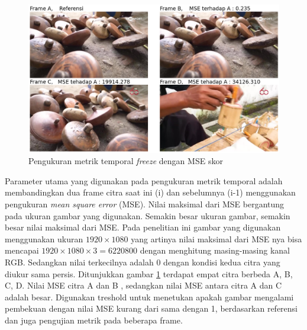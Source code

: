 \begin{figure}[H]
	\vspace{-0.1cm}
	\begin{center}
		\includegraphics[width=1\columnwidth]{bab4/Gambar/temporal-score.png}
	\end{center}
	\vspace{-0.2cm}
	\caption{Pengukuran metrik temporal \textit{freeze} dengan MSE skor}
	\label{temporal-score}
\end{figure}

Parameter utama yang digunakan pada pengukuran metrik temporal adalah membandingkan dua frame citra saat ini (i) dan sebelumnya (i-1) menggunakan pengukuran \textit{mean square error} (MSE). Nilai maksimal dari MSE bergantung pada ukuran gambar yang digunakan. Semakin besar ukuran gambar, semakin besar nilai maksimal dari MSE. Pada penelitian ini gambar yang digunakan menggunakan ukuran $1920\times1080$ yang artinya nilai maksimal dari MSE nya bisa mencapai $1920\times1080\times3=6220800$ dengan menghitung masing-masing kanal RGB. Sedangkan nilai terkecilnya adalah 0 dengan kondisi kedua citra yang diukur sama persis.  Ditunjukkan  gambar \ref{temporal-score} terdapat empat citra berbeda {A, B, C, D}. Nilai MSE citra A dan B , sedangkan nilai MSE antara citra A dan C adalah besar. Digunakan treshold untuk menetukan apakah gambar mengalami pembekuan dengan nilai MSE kurang dari sama dengan 1, berdasarkan referensi \citep{Quan_Huynh_Thu_2009} dan juga pengujian metrik pada beberapa frame. 

